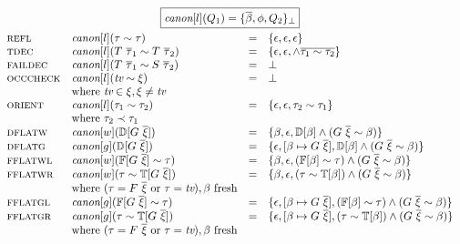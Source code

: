 \documentclass{article}
\newcommand{\multi}[1]{{\overline{#1}}}
\newcommand{\rulen}[1]{\textsc{#1}}
\newcommand{\D}{\mathbb{D}} %
\newcommand{\T}{\mathbb{T}} %
\newcommand{\F}{\mathbb{F}} %
\begin{document}
\[
\begin{array}{llcl}
\multicolumn{4}{c}{\framebox{$\canon{l}{Q_1} = \{ \multi{\beta}, \phi, Q_2 \}_\bot$}} \\
\\[-3mm]

\rulen{refl}     & \canon{l}{\tau               \sim \tau}               & = & \{ \epsilon, \epsilon, \epsilon \} \\
\rulen{tdec}     & \canon{l}{T ~ \multi{\tau}_1 \sim T ~ \multi{\tau}_2} & = & \{ \epsilon, \epsilon, \land\multi{\tau_1 \sim \tau_2} \} \\
\rulen{faildec}  & \canon{l}{T ~ \multi{\tau}_1 \sim S ~ \multi{\tau}_2} & = & \bot \\
\rulen{occcheck} & \canon{l}{\textit{tv} \sim \xi}                       & = & \bot \\
                 & \text{where} ~ \textit{tv} \in \xi, \xi \neq \textit{tv} \\
\rulen{orient}   & \canon{l}{\tau_1 \sim \tau_2}                         & = & \{ \epsilon, \epsilon, \tau_2 \sim \tau_1 \} \\
                 & \text{where} ~ \tau_2 \prec \tau_1 \\
\rulen{dflatw}   & \canon{w}{\D[G ~ \multi{\xi}]}                      & = & \{ \beta, \epsilon, \D[\beta] \land (G ~ \multi{\xi} \sim \beta) \} \\
\rulen{dflatg}   & \canon{g}{\D[G ~ \multi{\xi}]}                      & = & \{ \epsilon, [\beta \mapsto G ~ \multi{\xi}], \D[\beta] \land (G ~ \multi{\xi} \sim \beta) \} \\
\rulen{fflatwl}  & \canon{w}{\F[G ~ \multi{\xi}] \sim \tau}               & = & \{ \beta, \epsilon, (\F[\beta] \sim \tau) \land (G ~ \multi{\xi} \sim \beta) \} \\
\rulen{fflatwr}  & \canon{w}{\tau \sim \T[G ~ \multi{\xi}]}              & = & \{ \beta, \epsilon, (\tau \sim \T[\beta]) \land (G ~ \multi{\xi} \sim \beta) \} \\
                 & \text{where} ~ (\tau = F ~ \multi{\xi} ~ \text{or} ~ \tau = \textit{tv}), \beta ~ \text{fresh} \\
\rulen{fflatgl}  & \canon{g}{\F[G ~ \multi{\xi}] \sim \tau}              & = & \{ \epsilon, [\beta \mapsto G ~ \multi{\xi}], (\F[\beta] \sim \tau) \land (G ~ \multi{\xi} \sim \beta) \} \\
\rulen{fflatgr}  & \canon{g}{\tau \sim \T[G ~ \multi{\xi}]}              & = & \{ \epsilon, [\beta \mapsto G ~ \multi{\xi}], (\tau \sim \T[\beta]) \land (G ~ \multi{\xi} \sim \beta) \} \\
                 & \text{where} ~ (\tau = F ~ \multi{\xi} ~ \text{or} ~ \tau = \textit{tv}), \beta ~ \text{fresh}

\end{array}
\]
\end{document}
